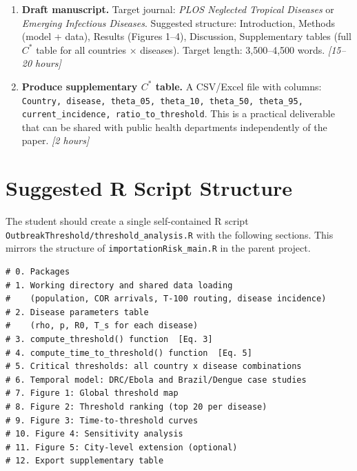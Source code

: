\documentclass[12pt]{article}
\begin{document}
\begin{enumerate}[label=\textbf{T\arabic*.}, resume]

  \item \textbf{Draft manuscript.}
    Target journal: \textit{PLOS Neglected Tropical Diseases} or
    \textit{Emerging Infectious Diseases}. Suggested structure:
    Introduction, Methods (model + data), Results (Figures 1--4),
    Discussion, Supplementary tables (full $C^*$ table for all
    countries $\times$ diseases). Target length: 3,500--4,500 words.
    \textit{[15--20 hours]}

  \item \textbf{Produce supplementary $C^*$ table.}
    A CSV/Excel file with columns:
    \texttt{Country, disease, theta\_05, theta\_10, theta\_50, theta\_95,
    current\_incidence, ratio\_to\_threshold}.
    This is a practical deliverable that can be shared with
    public health departments independently of the paper.
    \textit{[2 hours]}

\end{enumerate}

\section{Suggested R Script Structure}

The student should create a single self-contained R script
\texttt{OutbreakThreshold/threshold\_analysis.R} with the following
sections. This mirrors the structure of \texttt{importationRisk\_main.R}
in the parent project.

\begin{verbatim}
# 0. Packages
# 1. Working directory and shared data loading
#    (population, COR arrivals, T-100 routing, disease incidence)
# 2. Disease parameters table
#    (rho, p, R0, T_s for each disease)
# 3. compute_threshold() function  [Eq. 3]
# 4. compute_time_to_threshold() function  [Eq. 5]
# 5. Critical thresholds: all country x disease combinations
# 6. Temporal model: DRC/Ebola and Brazil/Dengue case studies
# 7. Figure 1: Global threshold map
# 8. Figure 2: Threshold ranking (top 20 per disease)
# 9. Figure 3: Time-to-threshold curves
# 10. Figure 4: Sensitivity analysis
# 11. Figure 5: City-level extension (optional)
# 12. Export supplementary table
\end{verbatim}

\end{document}
